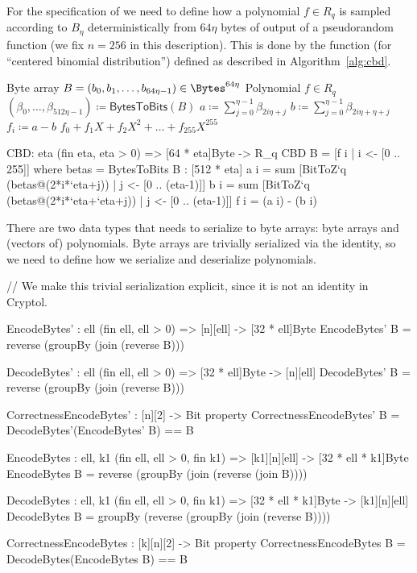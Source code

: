 For the specification of \Kyber we need to define how a polynomial $f \in R_q$ 
is sampled according to $B_\eta$ deterministically from $64\eta$ bytes of output of a
pseudorandom function (we fix $n=256$ in this description). 
This is done by the function \CBD (for ``centered binomial distribution'')
defined as described in Algorithm~\ref{alg:cbd}.

\begin{algorithm}
  \caption{$\CBD_{\eta}\colon\Bytes^{64\eta} \rightarrow R_q$
  }
  \label{alg:cbd}
  \begin{algorithmic}
    \Require Byte array $B = (b_0, b_1, \dots ,b_{64\eta-1}) \in \Bytes^{64\eta}$ 
    \Ensure Polynomial $f \in R_q$
    \State $(\beta_0,\dots,\beta_{512\eta-1}) \coloneqq \mathsf{BytesToBits}(B)$
      \State $a \coloneqq \sum_{j=0}^{\eta-1}\beta_{2i\eta+j}$
      \State $b \coloneqq \sum_{j=0}^{\eta-1}\beta_{2i\eta+\eta+j}$
      \State $f_i \coloneqq a-b$
    \EndFor
    \State \Return $f_0 + f_1X + f_2X^2 + \dots + f_{255}X^{255}$
  \end{algorithmic}
\end{algorithm}

\begin{code}
  CBD: {eta} (fin eta, eta > 0) => [64 * eta]Byte -> R_q
  CBD B = [f i | i <- [0 .. 255]]
      where betas = BytesToBits B : [512 * eta]
            a i = sum [BitToZ`{q} (betas@(2*i*`eta+j)) | j <- [0 .. (eta-1)]]
            b i = sum [BitToZ`{q} (betas@(2*i*`eta+`eta+j)) | j <- [0 .. (eta-1)]]
            f i = (a i) - (b i)
\end{code}

There are two data types that \Kyber needs to serialize to byte arrays:
byte arrays and (vectors of) polynomials. Byte arrays are trivially serialized
via the identity, so we need to define how we serialize and deserialize polynomials.

\begin{code}
  // We make this trivial serialization explicit, since it is not an identity in Cryptol.
  
  EncodeBytes' : {ell} (fin ell, ell > 0) => [n][ell] -> [32 * ell]Byte
  EncodeBytes' B = reverse (groupBy (join (reverse B)))

  DecodeBytes' : {ell} (fin ell, ell > 0) => [32 * ell]Byte -> [n][ell]
  DecodeBytes' B = reverse (groupBy (join (reverse B)))

  CorrectnessEncodeBytes' : [n][2] -> Bit
  property CorrectnessEncodeBytes' B = DecodeBytes'(EncodeBytes' B) == B
  
  EncodeBytes : {ell, k1} (fin ell, ell > 0, fin k1) =>
      [k1][n][ell] -> [32 * ell * k1]Byte
  EncodeBytes B = reverse (groupBy (join (reverse (join B))))

  DecodeBytes : {ell, k1} (fin ell, ell > 0, fin k1) =>
      [32 * ell * k1]Byte -> [k1][n][ell]
  DecodeBytes B = groupBy (reverse (groupBy (join (reverse B))))
  
  CorrectnessEncodeBytes : [k][n][2] -> Bit
  property CorrectnessEncodeBytes B = DecodeBytes(EncodeBytes B) == B
\end{code}

